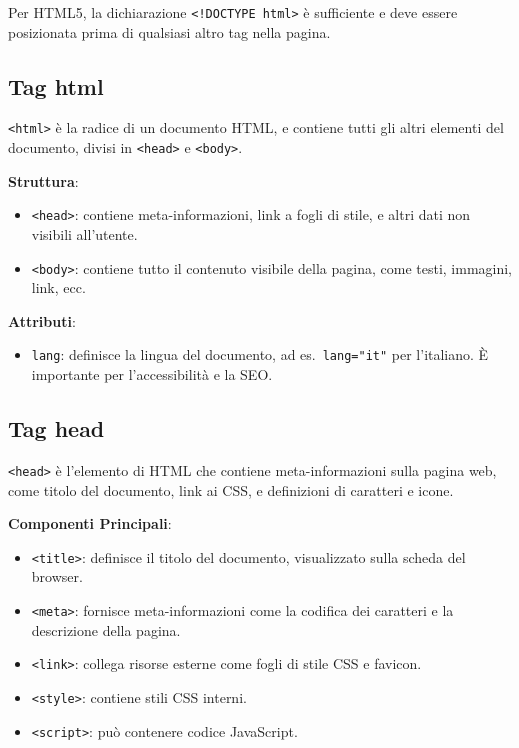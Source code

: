 Per HTML5, la dichiarazione \texttt{<!DOCTYPE html>} è sufficiente e deve essere posizionata prima di qualsiasi altro tag nella pagina.

\subsection{Tag html}

\texttt{<html>} è la radice di un documento HTML, e contiene tutti gli altri elementi del documento, divisi in \texttt{<head>} e \texttt{<body>}.

\textbf{Struttura}:
\begin{itemize}
    \item \texttt{<head>}: contiene meta-informazioni, link a fogli di stile, e altri dati non visibili all'utente.
    \item \texttt{<body>}: contiene tutto il contenuto visibile della pagina, come testi, immagini, link, ecc.
\end{itemize}

\textbf{Attributi}:
\begin{itemize}
    \item \texttt{lang}: definisce la lingua del documento, ad es.\ \texttt{lang="it"} per l'italiano. È importante per l'accessibilità e la SEO.
\end{itemize}

\subsection{Tag head}

\texttt{<head>} è l'elemento di HTML che contiene meta-informazioni sulla pagina web, come titolo del documento, link ai CSS, e definizioni di caratteri e icone.

\textbf{Componenti Principali}:
\begin{itemize}
    \item \texttt{<title>}: definisce il titolo del documento, visualizzato sulla scheda del browser.
    \item \texttt{<meta>}: fornisce meta-informazioni come la codifica dei caratteri e la descrizione della pagina.
    \item \texttt{<link>}: collega risorse esterne come fogli di stile CSS e favicon.
    \item \texttt{<style>}: contiene stili CSS interni.
    \item \texttt{<script>}: può contenere codice JavaScript.
\end{itemize}


